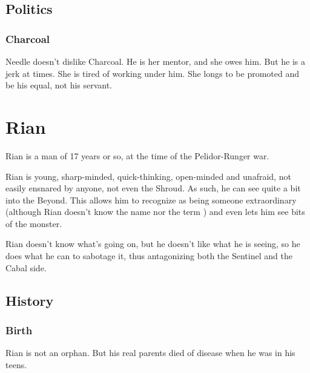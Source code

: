 \subsection{Politics}
\subsubsection{Charcoal}
Needle doesn't dislike Charcoal. 
He is her mentor, and she owes him. 
But he is a jerk at times. 
She is tired of working under him. 
She longs to be promoted and be his equal, not his servant. 















\section{Rian}
Rian is a \human{} man of 17 years or so, at the time of the Pelidor-Runger war. 

Rian is young, sharp-minded, quick-thinking, open-minded and unafraid, not easily ensnared by anyone, not even the Shroud. As such, he can see quite a bit into the Beyond. This allows him to recognize \Ishnaruchaefir{} as being someone extraordinary (although Rian doesn't know the name \quo{\Ishnaruchaefir} nor the term \quo{\vertex}) and even lets him see bits of the  monster. 

Rian doesn't know what's going on, but he doesn't like what he is seeing, so he does what he can to sabotage it, thus antagonizing both the Sentinel and the Cabal side. 









\subsection{History}
\subsubsection{Birth}
Rian is not an orphan. 
But his real parents died of disease when he was in his teens. 


